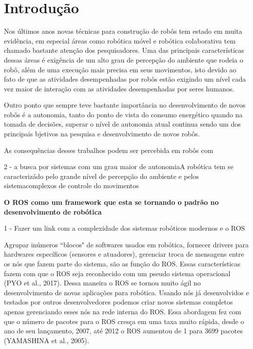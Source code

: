 \chapter{Introdução}


Nos últimos anos novas técnicas para construção de robôs tem estado em muita evidência, em especial áreas como robótica móvel e robótica colaborativa tem chamado bastante atenção dos pesquisadores. Uma das principais características dessas áreas é exigência de um alto grau de percepção do ambiente que rodeia o robô, além de uma execução mais precisa em seus movimentos, isto devido ao fato de que as atividades desempenhadas por robôs estão exigindo um nível cada vez maior de interação com as atividades desempenhadas por seres humanos.


Outro ponto que sempre teve bastante importância no desenvolvimento de novos robôs é a autonomia, tanto do ponto de vista do consumo energético quando na tomada de decisões, superar o nível de autonomia atual continua sendo um dos principais bjetivos na pesquisa e desenvolvimento de novos robôs.

As consequências desses trabalhos podem ser percebida em robôs com 

2 - a busca por sistemas com um grau maior de autonomiaA robótica tem se caracterizádo pelo grande nível de percepção do ambiente e pelos sistemacomplexos de controle do movimentos 


\textbf{O ROS como um framework que esta se tornando o padrão no desenvolvimento de robótica}

1 - Fazer um link com a complexidade dos sistemas robóticos modernos e o ROS

Agrupar inúmeros “blocos" de softwares usados em robótica, fornecer drivers para hardwares específicos (sensores e atuadores), gerenciar troca de mensagens entre os nós que fazem parte do sistema, são as função do ROS. Essas características fazem com que o ROS seja reconhecido com um pseudo sistema operacional (PYO et al., 2017). Dessa maneira o ROS se tornou muito ágil no desenvolvimento de novas aplicações para robótica. Usando nós já desenvolvidos e testados por outros desenvolvedores podemos criar novos sistemas completos apenas gerenciando esses nós na rede interna do ROS. Essa abordagem fez com que o número de pacotes para o ROS cresça em uma taxa muito rápida, desde o ano de seu lançamento, 2007, até 2012 o ROS aumentou de 1 para 3699 pacotes (YAMASHINA et al., 2005).


